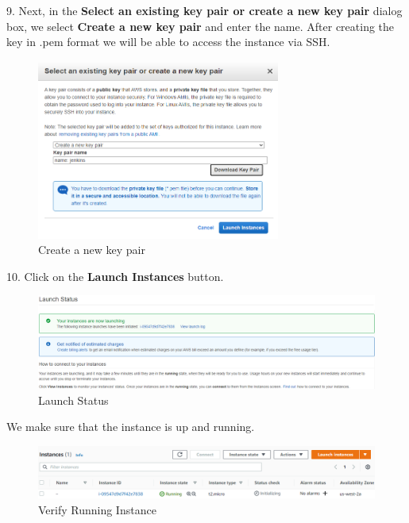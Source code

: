 \documentclass[12pt,a4paper,twoside]{article}
\begin{document}
9. Next, in the \textbf{Select an existing key pair or create a new key pair} dialog box, we select \textbf{Create a new key pair} and enter the name. After creating the key in .pem format we will be able to access the instance via SSH.


\begin{figure}[H]
    \centering
        \includegraphics[width=8cm]{images-aws/10-key-pair.png}
        \caption{Create a new key pair}
\end{figure}


10. Click on the \textbf{Launch Instances} button.


\begin{figure}[H]
    \centering
        \includegraphics[width=15cm]{images-aws/11-launch-status.png}
        \caption{Launch Status}
\end{figure}


We make sure that the instance is up and running.


\begin{figure}[H]
    \centering
        \includegraphics[width=15cm]{images-aws/12-running-instance.png}
        \caption{Verify Running Instance}
\end{figure}



~\newpage
\end{document}
